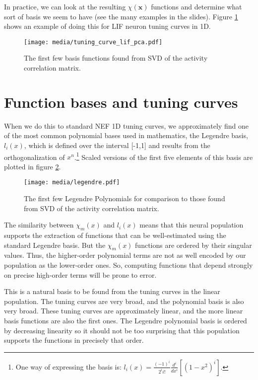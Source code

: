 \documentclass[10pt,letterpaper,oneside]{article}
\begin{document}
In practice, we can look at the resulting $\chi(\mathbf{x})$ functions
and determine what sort of basis we seem to have (see the many examples in the slides). Figure \ref{lif.pca} shows an example of doing this for LIF neuron tuning curves in 1D.

\begin{figure}[t]
  \centering
  \texttt{[image: media/tuning\_curve\_lif\_pca.pdf]}
  \caption{The first few basis functions found from SVD of the activity correlation matrix.}
	\label{lif.pca}
\end{figure}

\section{Function bases and tuning curves}

When we do this to standard NEF 1D tuning curves, we approximately find one of the most common polynomial bases
used in mathematics, the Legendre basis,
$l_{i}(x)$, which is defined over the interval {[}-1,1{]} and results
from the orthogonalization of $x^{n}$.\footnote{One way of expressing the basis is: $l_{i}(x)=\frac{(-1)^{i}}{2^{i}i!}\frac{d^{i}}{dx^{i}}\left[\left(1-x^{2}\right)^{i}\right]$.}
Scaled versions of the first five elements of this basis are plotted
in figure \ref{c5.fig.broad.chi}. 

\begin{figure}[t]
  \centering
  \texttt{[image: media/legendre.pdf]}
  \caption{The first few Legendre Polynomials for comparison to those found from SVD of the activity correlation matrix.}
	\label{c5.fig.broad.chi}
\end{figure}

The similarity between $\chi_{m}(x)$ and $l_{i}(x)$ means that this
neural population supports the extraction of functions that can be
well-estimated using the standard Legendre basis. But the $\chi_{m}(x)$
functions are ordered by their singular values. Thus, the higher-order
polynomial terms are not as well encoded by our population as the
lower-order ones. So, computing functions that depend strongly on
precise high-order terms will be prone to error.

This is a natural basis to be found from the tuning curves in the
linear population. The tuning curves are very broad, and the polynomial
basis is also very broad. These tuning curves are approximately linear,
and the more linear basis functions are also the first ones. The Legendre
polynomial basis is ordered by decreasing linearity so it should not
be too surprising that this population supports the functions in precisely
that order. 
\end{document}
